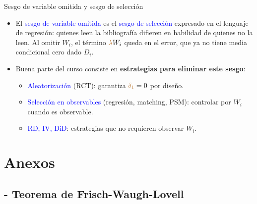 \documentclass[9pt, xcolor=dvipsnames]{beamer}
\begin{document}
\begin{frame}{Sesgo de variable omitida y sesgo de selección}
\begin{itemize}
    \item El \textcolor{blue}{sesgo de variable omitida} es el \textcolor{blue}{sesgo de selección} expresado en el lenguaje de regresión: quienes leen la bibliografía difieren en habilidad de quienes no la leen. Al omitir \(W_i\), el término \(\textcolor{brown}{\lambda} W_i\) queda en el error, que ya no tiene media condicional cero dado \(D_i\).
    \vspace{1em}
    \item Buena parte del curso consiste en \textbf{estrategias para eliminar este sesgo}:
    \begin{itemize}
        \item \textcolor{blue}{Aleatorización} (RCT): garantiza \(\textcolor{brown}{\delta_1} = 0\) por diseño.
        \item \textcolor{blue}{Selección en observables} (regresión, matching, PSM): controlar por \(W_i\) cuando es observable.
        \item \textcolor{blue}{RD, IV, DiD}: estrategias que no requieren observar \(W_i\).
    \end{itemize}
\end{itemize}
\end{frame}


\section{Anexos}

\subsection{- Teorema de Frisch-Waugh-Lovell}
\end{document}
